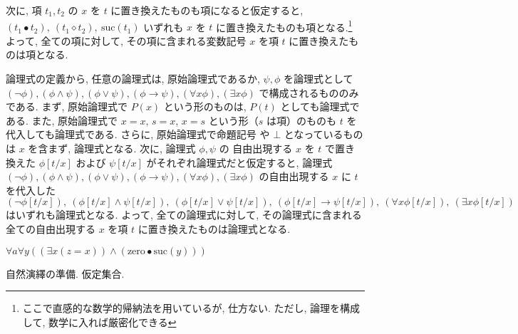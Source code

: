 \begin{nmprob}
{次に, 項 $t_1, t_2$ の $x$ を $t$ に置き換えたものも項になると仮定すると, $(t_1 \bullet t_2),\ (t_1 \diamond t_2),\ \text{suc} (t_1)$ いずれも $x$ を $t$ に置き換えたものも項となる.\footnote[1]{ここで直感的な数学的帰納法を用いているが, 仕方ない. ただし, 論理を構成して, 数学に入れば厳密化できる}
よって, 全ての項に対して, その項に含まれる変数記号 $x$ を項 $t$ に置き換えたものは項となる.
\item 論理式の定義から, 任意の論理式は, 原始論理式であるか, $\psi, \phi$ を論理式として$(\lnot \phi), (\phi \land \psi), (\phi \lor \psi), (\phi \to \psi), (\forall x \phi), (\exists x \phi)$ で構成されるもののみである.
まず, 原始論理式で $P(x)$ という形のものは, $P(t)$ としても論理式である. また, 原始論理式で $x = x$, $s = x$, $x = s$ という形（$s$ は項）のものも $t$ を代入しても論理式である. さらに, 原始論理式で命題記号 や $\bot$ となっているものは $x$ を含まず, 論理式となる.
次に, 論理式 $\phi, \psi$ の 自由出現する $x$ を $t$ で置き換えた $\phi [t/x]$ および $\psi [t/x]$ がそれぞれ論理式だと仮定すると, 論理式 $(\lnot \phi), (\phi \land \psi), (\phi \lor \psi), (\phi \to \psi), (\forall x \phi), (\exists x \phi)$ の自由出現する $x$ に $t$ を代入した
$(\lnot \phi[t/x]),\ (\phi[t/x] \land \psi[t/x]),\ (\phi[t/x] \lor \psi[t/x]),\ (\phi[t/x] \to \psi[t/x]),\ (\forall x \phi[t/x]),\ (\exists x \phi[t/x])$ はいずれも論理式となる.
よって, 全ての論理式に対して, その論理式に含まれる全ての自由出現する $x$ を項 $t$ に置き換えたものは論理式となる.
\item $\forall a \forall y ((\exists x (z = x)) \land (\text{zero} \bullet \text{suc} (y)))$
}
\end{nmprob}



\begin{nmprob}
自然演繹の準備. 仮定集合.
\end{nmprob}
